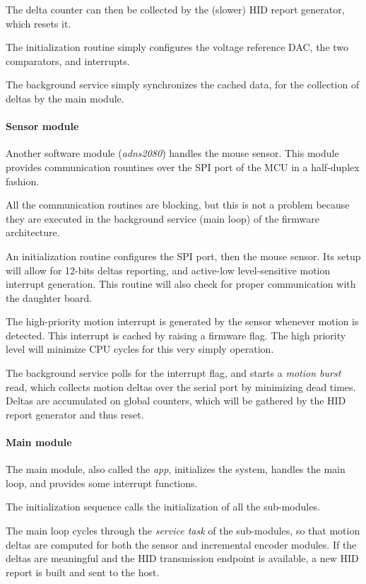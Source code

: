 \documentclass[a4paper,10pt]{article}
\begin{document}
\begin{multicols}{2}
The delta counter can then be collected by the (slower) HID report generator,
which resets it.

The initialization routine simply configures the voltage reference DAC, the
two comparators, and interrupts.

The background service simply synchronizes the cached data, for the
collection of deltas by the main module.


\paragraph{Sensor module}
Another software module (\emph{adns2080}) handles the mouse sensor. This
module provides communication rountines over the SPI port of the MCU in a
half-duplex fashion.

All the communication routines are blocking, but this is not a problem because
they are executed in the background service (main loop) of the firmware
architecture.

An initialization routine configures the SPI port, then the mouse sensor. Its
setup will allow for 12-bits deltas reporting, and active-low level-sensitive
motion interrupt generation. This routine will also check for proper
communication with the daughter board.

The high-priority motion interrupt is generated by the sensor whenever motion
is detected. This interrupt is cached by raising a firmware flag. The high
priority level will minimize CPU cycles for this very simply operation.

The background service polls for the interrupt flag, and starts a \emph{motion
burst} read, which collects motion deltas over the serial port by minimizing
dead times. Deltas are accumulated on global counters, which will be gathered
by the HID report generator and thus reset.


\paragraph{Main module}
The main module, also called the \emph{app}, initializes the system, handles
the main loop, and provides some interrupt functions.

The initialization sequence calls the initialization of all the sub-modules.

The main loop cycles through the \emph{service task} of the sub-modules, so
that motion deltas are computed for both the sensor and incremental encoder
modules. If the deltas are meaningful and the HID transmission endpoint is
available, a new HID report is built and sent to the host.


\end{multicols}
\end{document}
